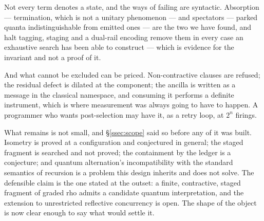 \documentclass[11pt,a4paper]{article}
\theoremstyle{plain}
\theoremstyle{definition}
\theoremstyle{remark}
\begin{document}
Not every term denotes a state, and the ways of failing are syntactic.
Absorption --- termination, which is not a unitary phenomenon --- and spectators
--- parked quanta indistinguishable from emitted ones --- are the two we have
found, and halt tagging, staging and a dual-rail encoding remove them in every
case an exhaustive search has been able to construct --- which is evidence for
the invariant and not a proof of it.

And what cannot be excluded can be priced. Non-contractive clauses are refused;
the residual defect is dilated at the component; the ancilla is written as a
message in the classical namespace, and consuming it performs a definite
instrument, which is where measurement was always going to have to happen. A
programmer who wants post-selection may have it, as a retry loop, at $2^n$
firings.

What remains is not small, and \S\ref{ssec:scope} said so before any of it was
built. Isometry is proved at a configuration and conjectured in general; the
staged fragment is searched and not proved; the containment by the ledger is a
conjecture; and quantum alternation's incompatibility with the standard
semantics of recursion is a problem this design inherits and does not solve.
The defensible claim is the one stated at the outset: a finite, contractive,
staged fragment of graded rho admits a candidate quantum interpretation, and the
extension to unrestricted reflective concurrency is open. The shape of the
object is now clear enough to say what would settle it.
\end{document}
